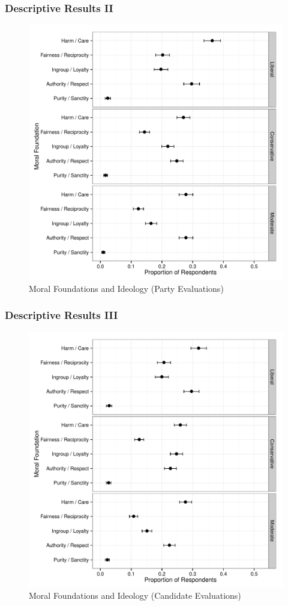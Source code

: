 \documentclass{beamer}
\begin{document}
\begin{frame}%
  \frametitle{Descriptive Results II}
  \begin{figure}[ht]\centering
    \includegraphics[height=.75\textheight]{p2_mft_ideol_pa}
    \caption{Moral Foundations and Ideology (Party Evaluations)}
  \end{figure}
\end{frame}

\begin{frame}%
  \frametitle{Descriptive Results III}
  \begin{figure}[ht]\centering
    \includegraphics[height=.75\textheight]{p3_mft_ideol_ca}
    \caption{Moral Foundations and Ideology (Candidate Evaluations)}
  \end{figure}
\end{frame}
\end{document}

